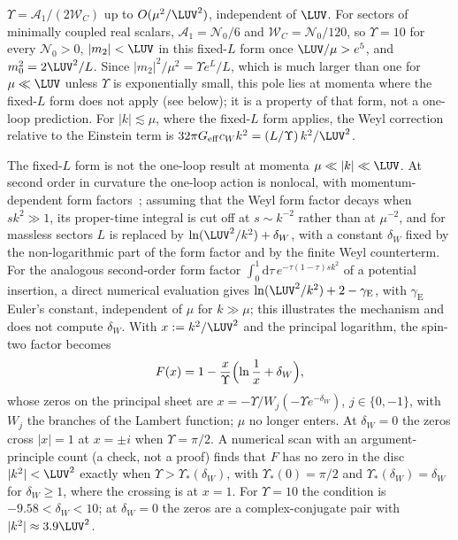 \(\Upsilon=\mathcal A_1/(2\mathcal W_C)\) up to \(O(\mu^2/\LUV^2)\),
independent of \(\LUV\). For sectors of minimally coupled real scalars,
\(\mathcal A_1=\mathcal N_0/6\) and \(\mathcal W_C=\mathcal N_0/120\), so
\(\Upsilon=10\) for every \(\mathcal N_0>0\),
\(|m_2|<\LUV\) in this fixed-\(L\) form once \(\LUV/\mu>e^{5}\), and
\(m_0^2=2\LUV^2/L\). Since \(|m_2|^2/\mu^2=\Upsilon e^{L}/L\), which is
much larger than one for \(\mu\ll\LUV\) unless \(\Upsilon\) is
exponentially small, this pole lies at momenta where the fixed-\(L\)
form does not apply (see below); it is a property of that form, not a
one-loop prediction. For \(|k|\lesssim\mu\), where the fixed-\(L\) form
applies, the Weyl correction relative to the Einstein term is
\(32\pi G_{\mathrm{eff}}c_Wk^2=(L/\Upsilon)\,k^2/\LUV^2\).

The fixed-\(L\) form is not the one-loop result at momenta
\(\mu\ll|k|\ll\LUV\). At second order in curvature the one-loop action
is nonlocal, with momentum-dependent form factors~\cite{BarvinskyVilkovisky1990}; assuming that
the Weyl form factor decays when \(sk^2\gg1\), its proper-time integral
is cut off at \(s\sim k^{-2}\) rather than at \(\mu^{-2}\), and for
massless sectors \(L\) is replaced by \(\ln(\LUV^2/k^2)+\delta_W\), with
a constant \(\delta_W\) fixed by the non-logarithmic part of the form
factor and by the finite Weyl counterterm. For the analogous
second-order form factor \(\int_0^1\mathrm d\tau\,
e^{-\tau(1-\tau)sk^2}\) of a potential insertion, a direct
numerical evaluation gives \(\ln(\LUV^2/k^2)+2-\gamma_{\mathrm E}\),
with \(\gamma_{\mathrm E}\) Euler's constant,
independent of \(\mu\) for \(k\gg\mu\); this illustrates the mechanism
and does not compute \(\delta_W\). With \(x:=k^2/\LUV^2\) and the
principal logarithm, the spin-two factor becomes
\[
  F(x)=1-\frac{x}{\Upsilon}\Bigl(\ln\frac1x+\delta_W\Bigr),
\]
whose zeros on the principal sheet are
\(x=-\Upsilon/W_j(-\Upsilon e^{-\delta_W})\), \(j\in\{0,-1\}\), with
\(W_j\) the branches of the Lambert function; \(\mu\) no longer enters.
At \(\delta_W=0\) the zeros cross \(|x|=1\) at \(x=\pm i\) when
\(\Upsilon=\pi/2\). A numerical scan with an argument-principle count
(a check, not a proof) finds that \(F\) has no zero in the disc
\(|k^2|<\LUV^2\) exactly when \(\Upsilon>\Upsilon_*(\delta_W)\), with
\(\Upsilon_*(0)=\pi/2\) and \(\Upsilon_*(\delta_W)=\delta_W\) for
\(\delta_W\ge1\), where the crossing is at \(x=1\). For \(\Upsilon=10\)
the condition is \(-9.58<\delta_W<10\); at \(\delta_W=0\) the zeros
are a complex-conjugate pair with \(|k^2|\approx3.9\LUV^2\).

